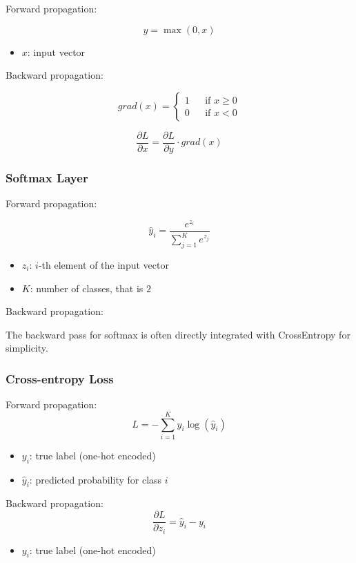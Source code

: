 \documentclass{article}
\begin{document}
Forward propagation:

$$ y = \max(0, x) $$

\begin{itemize}
    \item $x$: input vector
\end{itemize}

Backward propagation:

$$
grad(x)=
\left\{
    \begin{aligned}
        1 && \text{if $x \geq 0$}\\
        0 && \text{if $x < 0$}
    \end{aligned}
\right.
$$

$$ \frac{\partial L}{\partial x} = \frac{\partial L}{\partial y} \cdot grad(x) $$

\subsubsection{Softmax Layer}

Forward propagation:

$$ \hat{y}_i = \frac{e^{z_i}}{\sum_{j=1}^{K} e^{z_j}} $$

\begin{itemize}
    \item $z_i$: $i$-th element of the input vector
    \item $K$: number of classes, that is $2$
\end{itemize}

Backward propagation:

The backward pass for softmax is often directly integrated with CrossEntropy for simplicity.

\subsubsection{Cross-entropy Loss}

Forward propagation:
$$ L = -\sum_{i=1}^{K} y_i \log(\hat{y}_i) $$

\begin{itemize}
    \item $y_i$: true label (one-hot encoded)
    \item $\hat{y}_i$: predicted probability for class $i$
\end{itemize}

Backward propagation:
$$ \frac{\partial L}{\partial z_i} = \hat{y}_i - y_i $$

\begin{itemize}
    \item  $y_i$: true label (one-hot encoded)
\end{itemize}
\end{document}

